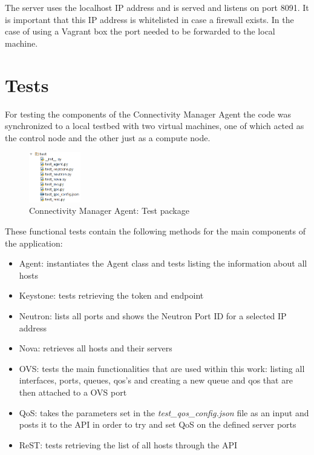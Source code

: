 The server uses the localhost IP address and is served and listens on port 8091. It is important that this IP address is whitelisted in case a firewall exists. In the case of using a Vagrant box the port needed to be forwarded to the local machine.

\section{Tests}

For testing the components of the Connectivity Manager Agent the code was synchronized to a local testbed with two virtual machines, one of which acted as the control node and the other just as a compute node. 

\begin{figure}[H]
\centering

\includegraphics[width=0.2\textwidth]{images/implementation/cma_tests.png}

\caption{Connectivity Manager Agent: Test package}
\end{figure}

These functional tests contain the following methods for the main components of the application:
\begin{itemize}
\item Agent: instantiates the Agent class and tests listing the information about all hosts
\item Keystone: tests retrieving the token and endpoint
\item Neutron: lists all ports and shows the Neutron Port ID for a selected IP address
\item Nova: retrieves all hosts and their servers
\item OVS: tests the main functionalities that are used within this work: listing all interfaces, ports, queues, qos's and creating a new queue and qos that are then attached to a OVS port
\item QoS: takes the parameters set in the \textit{test\_qos\_config.json} file as an input and posts it to the API in order to try and set QoS on the defined server ports
\item ReST: tests retrieving the list of all hosts through the API
\end{itemize}

